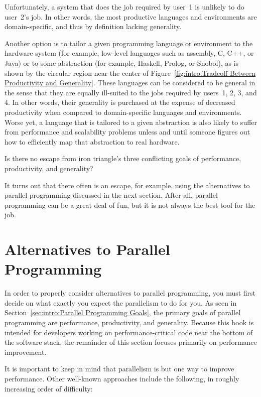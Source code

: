 Unfortunately, a system that does the job required by user~1 is
unlikely to do user~2's job.
In other words, the most productive languages and environments are
domain-specific, and thus by definition lacking generality.

Another option is to tailor a given programming language or environment
to the hardware system (for example, low-level languages such as
assembly, C, C++, or Java) or to some abstraction (for example,
Haskell, Prolog, or Snobol), as is shown by the circular region near
the center of
Figure~\ref{fig:intro:Tradeoff Between Productivity and Generality}.
These languages can be considered to be general in the sense that they
are equally ill-suited to the jobs required by users~1, 2, 3, and 4.
In other words, their generality is purchased at the expense of
decreased productivity when compared to domain-specific languages
and environments.
Worse yet, a language that is tailored to a given abstraction
is also likely to suffer from performance and scalability problems
unless and until someone figures out how to efficiently map that
abstraction to real hardware.

Is there no escape from iron triangle's three conflicting goals of
performance, productivity, and generality?

It turns out that there often is an escape, for example,
using the alternatives to parallel programming discussed in the next section.
After all, parallel programming can be a great deal of fun, but
it is not always the best tool for the job.

\section{Alternatives to Parallel Programming}
\label{sec:intro:Alternatives to Parallel Programming}

In order to properly consider alternatives to parallel programming,
you must first decide on what exactly you expect the parallelism
to do for you.
As seen in Section~\ref{sec:intro:Parallel Programming Goals},
the primary goals of parallel programming are performance, productivity,
and generality.
Because this book is intended for developers working on
performance-critical code near the bottom of the software stack,
the remainder of this section focuses primarily on performance improvement.

It is important to keep in mind that parallelism is but one way to
improve performance.
Other well-known approaches include the following, in roughly increasing
order of difficulty:


